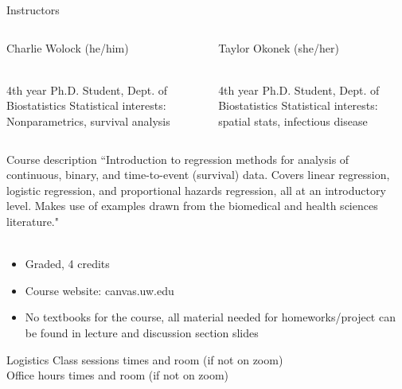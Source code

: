 \documentclass[10pt,t]{beamer}
\begin{document}
\begin{frame}{Instructors}
\begin{columns}
	\begin{column}[t]{0.4\textwidth}
            \small Charlie Wolock (he/him) \\~\
            
            \small 4th year Ph.D. Student, Dept. of Biostatistics
            \small Statistical interests: Nonparametrics, survival analysis
	\end{column}
	\begin{column}[t]{0.4\textwidth}  %
			\small Taylor Okonek (she/her) \\~\ 
			
			\small 4th year Ph.D. Student, Dept. of Biostatistics
			\small Statistical interests: spatial stats, infectious disease
	\end{column}
\end{columns}

\end{frame}

\begin{frame}{Course description}
``Introduction to regression methods for analysis of continuous, binary, and time-to-event (survival) data. Covers linear regression, logistic regression, and proportional hazards regression, all at an introductory level. Makes use of examples drawn from the biomedical and health sciences literature." \\~\

\begin{itemize}
	\item Graded, 4 credits
	\item Course website: canvas.uw.edu
	\item No textbooks for the course, all material needed for homeworks/project can be found in lecture and discussion section slides
\end{itemize}

\end{frame}

\begin{frame}{Logistics}
Class sessions times and room (if not on zoom) \\
Office hours times and room (if not on zoom)
\end{frame}
\end{document}
